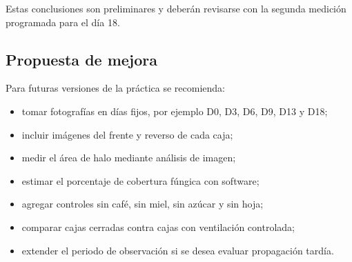 Estas conclusiones son preliminares y deberán revisarse con la segunda medición programada para el día 18.

\subsection{Propuesta de mejora}

Para futuras versiones de la práctica se recomienda:

\begin{itemize}
\item tomar fotografías en días fijos, por ejemplo D0, D3, D6, D9, D13 y D18;
\item incluir imágenes del frente y reverso de cada caja;
\item medir el área de halo mediante análisis de imagen;
\item estimar el porcentaje de cobertura fúngica con software;
\item agregar controles sin café, sin miel, sin azúcar y sin hoja;
\item comparar cajas cerradas contra cajas con ventilación controlada;
\item extender el periodo de observación si se desea evaluar propagación tardía.
\end{itemize}
